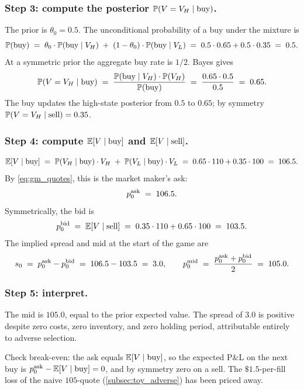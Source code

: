 \subsubsection{Step 3: compute the posterior $\mathbb{P}(V = V_H \mid \text{buy})$.}
The prior is $\theta_0 = 0.5$. The unconditional probability of a
buy under the mixture is
\[
  \mathbb{P}(\text{buy})
  \;=\; \theta_0 \cdot \mathbb{P}(\text{buy} \mid V_H)
       \;+\; (1 - \theta_0) \cdot \mathbb{P}(\text{buy} \mid V_L)
  \;=\; 0.5 \cdot 0.65 + 0.5 \cdot 0.35 \;=\; 0.5.
\]
At a symmetric prior the aggregate buy rate is $1/2$. Bayes gives
\[
  \mathbb{P}(V = V_H \mid \text{buy})
  \;=\; \frac{\mathbb{P}(\text{buy} \mid V_H) \cdot \mathbb{P}(V_H)}{\mathbb{P}(\text{buy})}
  \;=\; \frac{0.65 \cdot 0.5}{0.5} \;=\; 0.65.
\]
The buy updates the high-state posterior from $0.5$ to $0.65$; by
symmetry $\mathbb{P}(V = V_H \mid \text{sell}) = 0.35$.

\subsubsection{Step 4: compute $\mathbb{E}[V \mid \text{buy}]$ and $\mathbb{E}[V \mid \text{sell}]$.}
\[
  \mathbb{E}[V \mid \text{buy}]
  \;=\; \mathbb{P}(V_H \mid \text{buy}) \cdot V_H
       \;+\; \mathbb{P}(V_L \mid \text{buy}) \cdot V_L
  \;=\; 0.65 \cdot 110 + 0.35 \cdot 100 \;=\; 106.5.
\]
By \cref{eq:gm_quotes}, this is the market maker's ask:
\[
  p^{\mathrm{ask}}_0 \;=\; 106.5.
\]
Symmetrically, the bid is
\[
  p^{\mathrm{bid}}_0 \;=\; \mathbb{E}[V \mid \text{sell}]
  \;=\; 0.35 \cdot 110 + 0.65 \cdot 100 \;=\; 103.5.
\]
The implied spread and mid at the start of the game are
\[
  s_0 \;=\; p^{\mathrm{ask}}_0 - p^{\mathrm{bid}}_0 \;=\; 106.5 - 103.5 \;=\; 3.0,
  \qquad
  p^{\mathrm{mid}}_0 \;=\; \frac{p^{\mathrm{ask}}_0 + p^{\mathrm{bid}}_0}{2} \;=\; 105.0.
\]

\subsubsection{Step 5: interpret.}
The mid is $105.0$, equal to the prior expected value. The spread
of $3.0$ is positive despite zero costs, zero inventory, and zero
holding period, attributable entirely to adverse selection.

Check break-even: the ask equals $\mathbb{E}[V \mid \text{buy}]$, so the
expected P\&L on the next buy is $p^{\mathrm{ask}}_0 - \mathbb{E}[V \mid \text{buy}] =
0$, and by symmetry zero on a sell. The $\$1.5$-per-fill loss of
the naive $105$-quote (\cref{subsec:toy_adverse}) has been priced
away.

